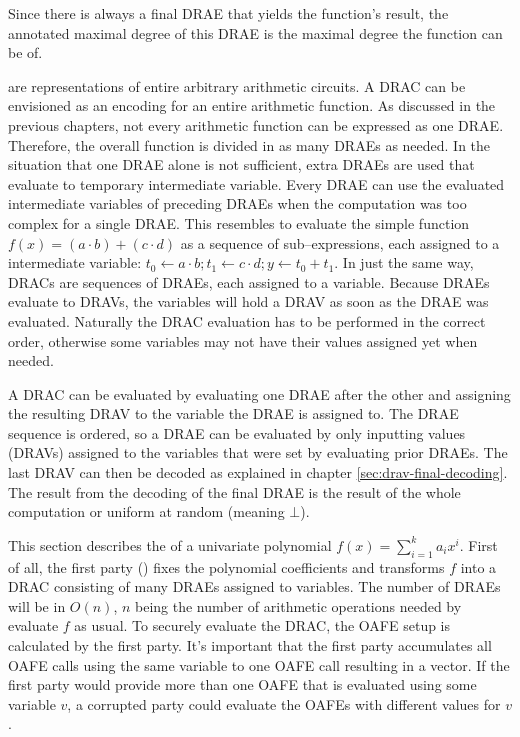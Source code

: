 Since there is always a final DRAE that yields the function's result, the
annotated maximal degree of this DRAE is the maximal degree the function can be
of.


%
%
\label{sec:drac}

 are representations of entire
arbitrary arithmetic circuits. A DRAC can be envisioned as an encoding for an
entire arithmetic function. As discussed in the previous chapters, not every
arithmetic function can be expressed as one DRAE. Therefore, the overall
function is divided in as many DRAEs as needed. In the situation that one DRAE
alone is not sufficient, extra DRAEs are used that evaluate to temporary
intermediate variable. Every DRAE can use the evaluated intermediate variables
of preceding DRAEs when the computation was too complex for a single DRAE. This
resembles to evaluate the simple function $f(x) = (a \cdot b) + (c \cdot d)$ as
a sequence of sub--expressions, each assigned to a intermediate variable: $t_0
\leftarrow a \cdot b; t_1 \leftarrow c \cdot d; y \leftarrow t_0 + t_1$.  In
just the same way, DRACs are sequences of DRAEs, each assigned to a variable.
Because DRAEs evaluate to DRAVs, the variables will hold a DRAV as soon as the
DRAE was evaluated. Naturally the DRAC evaluation has to be performed in the
correct order, otherwise some variables may not have their values assigned yet
when needed.


\label{sec:DRAC-eval}

A DRAC can be evaluated by evaluating one DRAE after the other and assigning the
resulting DRAV to the variable the DRAE is assigned to. The DRAE sequence is
ordered, so a DRAE can be evaluated by only inputting values (DRAVs) assigned to
the variables that were set by evaluating prior DRAEs. The last DRAV can then be
decoded as explained in chapter \ref{sec:drav-final-decoding}. The result from
the decoding of the final DRAE is the result of the whole computation or uniform
at random (meaning $\bot$).


%
%
\label{sec:OPE}

This section describes the  of a
univariate polynomial $f(x) = \sum_{i=1}^k a_ix^i$. First of all, the first
party (\JWpOne{}) fixes the polynomial coefficients and transforms $f$ into a
DRAC consisting of many DRAEs assigned to variables. The number of DRAEs will be
in $O(n)$, $n$ being the number of arithmetic operations needed by evaluate
$f$ as usual. To securely evaluate the DRAC, the OAFE setup is calculated by
the first party. It's important that the first party accumulates all OAFE calls
using the same variable to one OAFE call resulting in a vector. If the first
party would provide more than one OAFE that is evaluated using some variable
$v$, a corrupted party could evaluate the OAFEs with different values for $v$.

